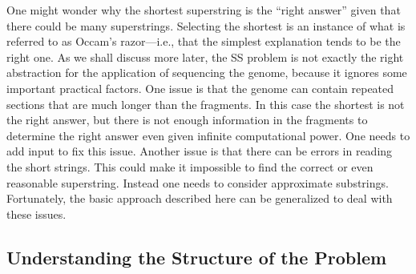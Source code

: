 \begin{remark}
  One might wonder why the shortest superstring is the ``right  
  answer'' given that there could be many superstrings.  Selecting the  
  shortest is an instance of what is referred to as Occam's razor---i.e.,
  that the simplest explanation tends to be the right one. 
%
As we shall discuss more later, the SS problem is not exactly the
right abstraction for the application of sequencing the genome,
because it ignores some important practical factors.
%
One issue is that the genome can contain repeated sections that are 
much longer than the fragments.
In this case the shortest is not the right answer, but there is not
enough information in the fragments to determine the right answer
even given infinite computational power.
One needs to add input to fix this issue.
%
Another issue is that there can be errors in reading the short
strings.  This could make it impossible to find the correct or even
reasonable superstring.    Instead one needs to consider
approximate substrings.
%
Fortunately, the basic approach described here can be generalized to
deal with these issues.
\end{remark}











\subsection{Understanding the Structure of the Problem}
\label{genome::prob::understanding}


